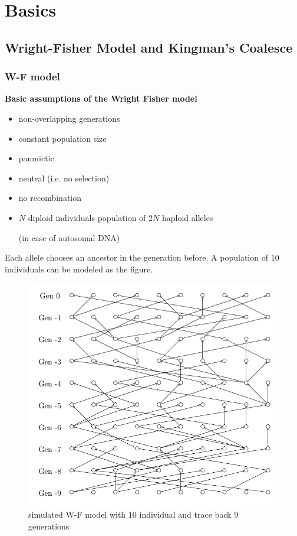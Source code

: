 \documentclass[12pt]{book}
\begin{document}
%  
\else
\fi

\chapter{Basics}

\section{Wright-Fisher Model and Kingman's Coalesce}
    \subsection{W-F model}
        \textbf{Basic assumptions of the Wright Fisher model}
        \begin{itemize}
            \item non-overlapping generations 
            \item constant population size
            \item panmictic
            \item neutral (i.e. no selection)
            \item no recombination
            \item $N$ diploid individuals population of $2N$ haploid alleles 
            
            (in case of autosomal DNA)
        \end{itemize}

        Each allele chooses an ancestor in the generation before. A population of $10$ individuals can be modeled as the figure.

        \begin{figure}[htbp]
            \centering
            \includegraphics[scale = 1]{fig/W-F_123.pdf}
            \caption{simulated W-F model with $10$ individual and trace back $9$ generations}
        \end{figure}
\end{document}
